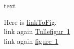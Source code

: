 \documentclass[a4paper,12pt]{article}
\newcommand{\aref}[2][figure]{%
  \hyperref[{#2}]{#1~\ref*{#2}}%
}
\begin{document}
text


\begin{figure}%
\centering
{}
\caption{}%
\label{fig:test}%
\end{figure}

\newpage
Here is \hyperref[fig:test]{linkToFig}.\\
link again \aref[Tullefigur]{fig:test}\\
link again \aref{fig:test}
\end{document}

